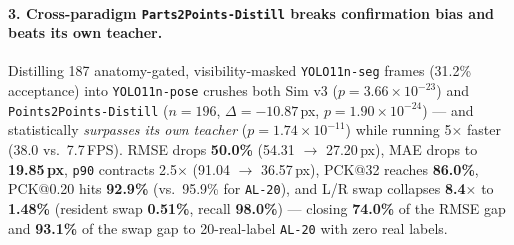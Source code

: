 \documentclass[10pt,twocolumn,letterpaper]{article}
\begin{document}
\paragraph{3. Cross-paradigm \texttt{Parts2Points-Distill} breaks confirmation bias and beats its own teacher.} Distilling 187 anatomy-gated, visibility-masked \texttt{YOLO11n-seg} frames (31.2\% acceptance) into \texttt{YOLO11n-pose} crushes both Sim v3 ($p=3.66\times 10^{-23}$) and \texttt{Points2Points-Distill} ($n=196$, $\Delta=-10.87$\,px, \textbf{$p=1.90\times 10^{-24}$}) — and statistically \emph{surpasses its own teacher} ($p=1.74\times 10^{-11}$) while running 5$\times$ faster (38.0 vs.\ 7.7\,FPS). RMSE drops \textbf{50.0\%} (54.31 $\to$ 27.20\,px), MAE drops to \textbf{19.85\,px}, \texttt{p90} contracts 2.5$\times$ (91.04 $\to$ 36.57\,px), PCK@32 reaches \textbf{86.0\%}, PCK@0.20 hits \textbf{92.9\%} (vs.\ 95.9\% for \texttt{AL-20}), and L/R swap collapses \textbf{8.4$\times$} to \textbf{1.48\%} (resident swap \textbf{0.51\%}, recall \textbf{98.0\%}) — closing \textbf{74.0\%} of the RMSE gap and \textbf{93.1\%} of the swap gap to 20-real-label \texttt{AL-20} with zero real labels.
\end{document}
